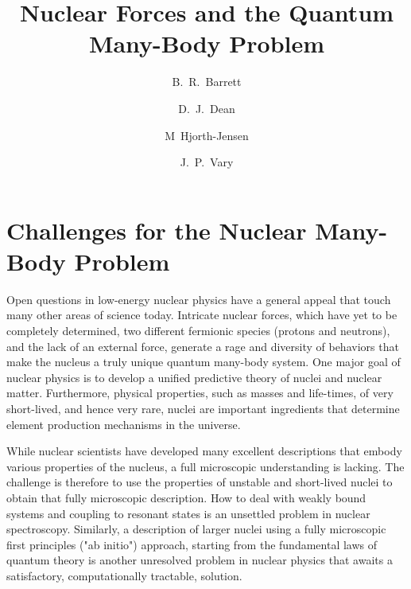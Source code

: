 \documentclass[12pt]{iopart}
\begin{document}
\title{Nuclear Forces and the Quantum Many-Body Problem} 


\author{B.~R.~Barrett}
\address{Department of Physics, PO Box 210081, University of Arizona, Tucson, 
         Arizona 85721, USA}


\author{D.~J.~Dean}
\address{Physics Division, Oak Ridge National Laboratory,
P.O. Box 2008, Oak Ridge, TN 37831-6373, USA\\
Center of Mathematics for Applications, 
University of Oslo,
N-0316 Oslo, Norway}


\author{M~Hjorth-Jensen}
\address{Department of Physics and Center of Mathematics for Applications, 
University of Oslo,
N-0316 Oslo, Norway\\
Department of Physics and Astronomy, Michigan State University,
East Lansing, MI 48824, USA}


\author{J.~P.~Vary}
\address{Department of Physics and Astronomy, Iowa State University, Ames, Iowa 50011, USA}


\maketitle
 
\section{Challenges for the Nuclear Many-Body Problem} 

Open questions in low-energy nuclear physics have a general appeal that
touch many other areas of science today. Intricate nuclear forces, which
have yet to be completely determined, two different fermionic species 
(protons and neutrons), and the lack of an external force, generate a
rage and diversity of behaviors that make the nucleus a truly unique 
quantum many-body system. One major goal of nuclear physics is to
develop a unified predictive theory of nuclei and nuclear matter. 
Furthermore, physical properties, such as masses and life-times,
of very short-lived, and hence very rare, nuclei are important
ingredients that determine element production mechanisms in
the universe. 

While nuclear scientists have developed many excellent descriptions
that embody various properties of the nucleus, a full microscopic
understanding is lacking. The challenge is therefore to use 
the properties of unstable and short-lived nuclei to obtain that
fully microscopic description. How to deal with weakly
bound systems and coupling to resonant states is an unsettled problem in
nuclear spectroscopy. Similarly,  a description of  larger nuclei using a
fully microscopic first principles ("ab initio") approach, starting from the
fundamental laws of quantum theory is another unresolved problem
in nuclear physics that awaits a satisfactory, computationally tractable,
solution.
\end{document}
